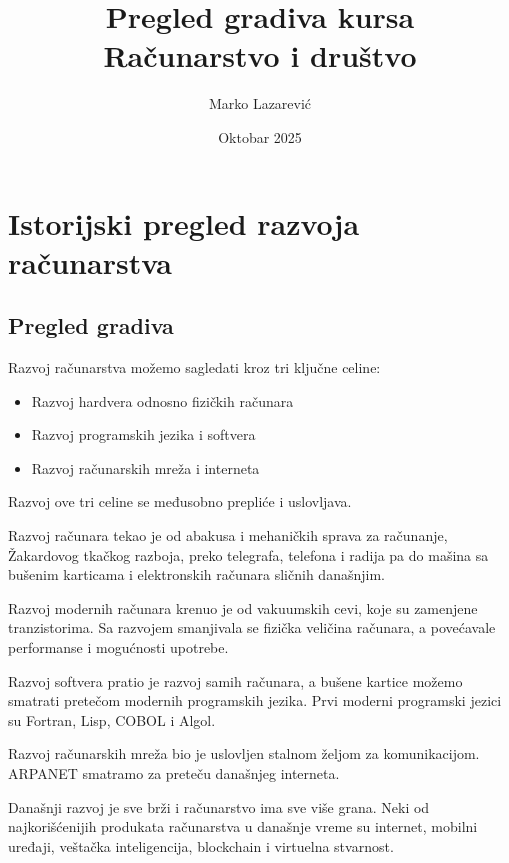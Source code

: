 \documentclass[a4paper,12pt]{article}
\title{Pregled gradiva kursa \\[0.5em] \large Računarstvo i društvo}
\author{Marko Lazarević}
\date{Oktobar 2025}
\begin{document}
\maketitle
\newpage
\tableofcontents
\newpage

\section{Istorijski pregled razvoja računarstva}
\subsection{Pregled gradiva}

Razvoj računarstva možemo sagledati kroz tri ključne celine:
\begin{itemize}
    \item Razvoj hardvera odnosno fizičkih računara
    \item Razvoj programskih jezika i softvera
    \item Razvoj računarskih mreža i interneta
\end{itemize}

Razvoj ove tri celine se međusobno prepliće i uslovljava.

Razvoj računara tekao je od abakusa i mehaničkih sprava za računanje, Žakardovog tkačkog razboja, preko telegrafa, telefona i radija pa do mašina sa bušenim karticama i elektronskih računara sličnih današnjim.

Razvoj modernih računara krenuo je od vakuumskih cevi, koje su zamenjene tranzistorima. Sa razvojem smanjivala se fizička veličina računara, a povećavale performanse i mogućnosti upotrebe.

Razvoj softvera pratio je razvoj samih računara, a bušene kartice možemo smatrati pretečom modernih programskih jezika. Prvi moderni programski jezici su Fortran, Lisp, COBOL i Algol.

Razvoj računarskih mreža bio je uslovljen stalnom željom za komunikacijom. ARPANET smatramo za preteču današnjeg interneta. 

Današnji razvoj je sve brži i računarstvo ima sve više grana. Neki od najkorišćenijih produkata računarstva u današnje vreme su internet, mobilni uređaji, veštačka inteligencija, blockchain i virtuelna stvarnost.
\end{document}
